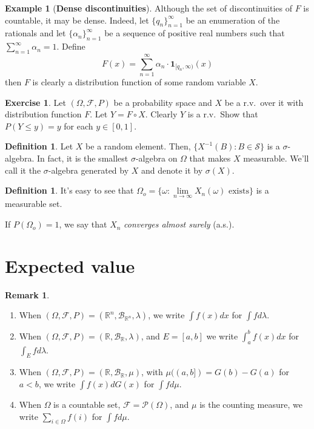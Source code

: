 \documentclass{article}
\theoremstyle{definition}
\newtheorem{definition}[theorem]{Definition}
\newtheorem{remark}[theorem]{Remark}
\newtheorem{example}[theorem]{Example}
\newtheorem{exercise}[theorem]{Exercise}
\begin{document}
\begin{example}[\textbf{Dense discontinuities}]
    Although the set of discontinuities of $F$ is countable, it may be dense. Indeed, let $\{ q_n \}_{n=1}^\infty$ be an enumeration of the rationals and let $\{ \alpha_n \}_{n=1}^\infty$ be a sequence of positive real numbers such that $\sum_{n=1}^\infty \alpha_n = 1$. Define
    \[ F(x) = \sum\limits_{n=1}^\infty \alpha_n \cdot \mathbf{1}_{[q_n, \infty)}(x) \]
    then $F$ is clearly a distribution function of some random variable $X$.
\end{example}

\begin{exercise}
    Let $(\Omega, \mathcal{F}, P)$ be a probability space and $X$ be a r.v.\ over it with distribution function $F$. Let $Y = F \circ X$. Clearly $Y$ is a r.v.\ Show that $P(Y \leq y) = y$ for each $y \in [0,1]$.
\end{exercise}

\begin{definition}
    Let $X$ be a random element. Then, $\{ X^{-1}(B) : B \in \mathcal{S} \}$ is a $\sigma$-algebra. In fact, it is the smallest $\sigma$-algebra on $\Omega$ that makes $X$ measurable. We'll call it the $\sigma$-algebra generated by $X$ and denote it by $\sigma(X)$.
\end{definition}

\begin{definition}
    It's easy to see that $\Omega_o = \{\omega : \lim\limits_{n \to \infty} X_n(\omega) \text{ exists} \}$ is a measurable set.

    If $P(\Omega_o) = 1$, we say that $X_n$ \textit{converges almost surely} (a.s.).
\end{definition}


\section{Expected value}

\begin{remark}
    \begin{enumerate}
        \item When $(\Omega, \mathcal{F}, P) = (\mathbb{R}^n, \mathcal{B}_{\mathbb{R}^n}, \lambda)$, we write $\int f(x) dx$ for $\int f d \lambda$.
        \item When $(\Omega, \mathcal{F}, P) = (\mathbb{R}, \mathcal{B}_{\mathbb{R}}, \lambda)$, and $E = [a, b]$ we write $\int_a^b f(x) dx$ for $\int_E f d \lambda$.
        \item When $(\Omega, \mathcal{F}, P) = (\mathbb{R}, \mathcal{B}_{\mathbb{R}}, \mu)$, with $\mu((a, b] ) = G(b) - G(a)$ for $a < b$, we write $\int f(x) dG(x)$ for $\int f d \mu$.
        \item When $\Omega$ is a countable set, $\mathcal{F} = \mathcal{P}(\Omega)$, and $\mu$ is the counting measure, we write
              $\sum_{i \in \Omega} f(i)$ for $\int f d \mu$.
    \end{enumerate}
\end{remark}
\end{document}
